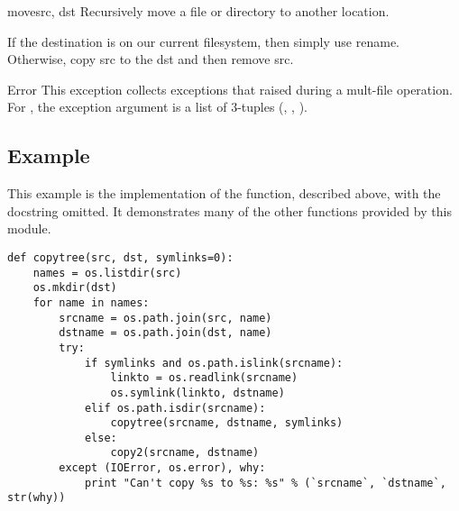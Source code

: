 \begin{funcdesc}{move}{src, dst}
Recursively move a file or directory to another location.

If the destination is on our current filesystem, then simply use
rename.  Otherwise, copy src to the dst and then remove src.

\end{funcdesc}

\begin{excdesc}{Error}
This exception collects exceptions that raised during a mult-file
operation. For , the exception argument is a
list of 3-tuples (, , ).

\end{excdesc}

\subsection{Example \label{shutil-example}}

This example is the implementation of the 
function, described above, with the docstring omitted.  It
demonstrates many of the other functions provided by this module.

\begin{verbatim}
def copytree(src, dst, symlinks=0):
    names = os.listdir(src)
    os.mkdir(dst)
    for name in names:
        srcname = os.path.join(src, name)
        dstname = os.path.join(dst, name)
        try:
            if symlinks and os.path.islink(srcname):
                linkto = os.readlink(srcname)
                os.symlink(linkto, dstname)
            elif os.path.isdir(srcname):
                copytree(srcname, dstname, symlinks)
            else:
                copy2(srcname, dstname)
        except (IOError, os.error), why:
            print "Can't copy %s to %s: %s" % (`srcname`, `dstname`, str(why))
\end{verbatim}
